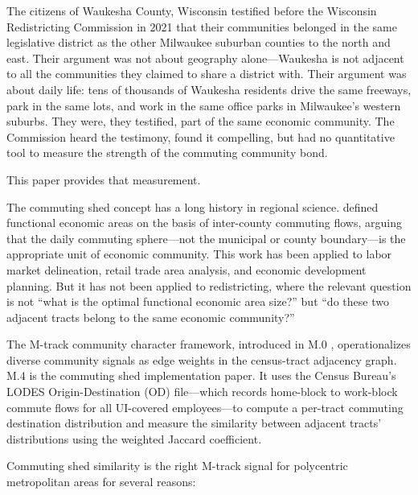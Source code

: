 \label{sec:introduction}

The citizens of Waukesha County, Wisconsin testified before the Wisconsin
Redistricting Commission in 2021 that their communities belonged in the same
legislative district as the other Milwaukee suburban counties to the north
and east.
Their argument was not about geography alone---Waukesha is not adjacent to
all the communities they claimed to share a district with.
Their argument was about daily life: tens of thousands of Waukesha residents
drive the same freeways, park in the same lots, and work in the same office
parks in Milwaukee's western suburbs.
They were, they testified, part of the same economic community.
The Commission heard the testimony, found it compelling, but had no quantitative
tool to measure the strength of the commuting community bond.

This paper provides that measurement.

The commuting shed concept has a long history in regional science.
\citet{tolbert1996labor} defined functional economic areas on the basis of
inter-county commuting flows, arguing that the daily commuting sphere---not
the municipal or county boundary---is the appropriate unit of economic community.
This work has been applied to labor market delineation, retail trade area
analysis, and economic development planning.
But it has not been applied to redistricting, where the relevant question is
not ``what is the optimal functional economic area size?'' but ``do these two
adjacent tracts belong to the same economic community?''

The M-track community character framework, introduced in M.0
\citep{m0framework}, operationalizes diverse community signals as edge
weights in the census-tract adjacency graph.
M.4 is the commuting shed implementation paper.
It uses the Census Bureau's LODES Origin-Destination (OD) file---which records
home-block to work-block commute flows for all UI-covered employees---to
compute a per-tract commuting destination distribution and measure the
similarity between adjacent tracts' distributions using the weighted
Jaccard coefficient.

Commuting shed similarity is the right M-track signal for polycentric
metropolitan areas for several reasons:


